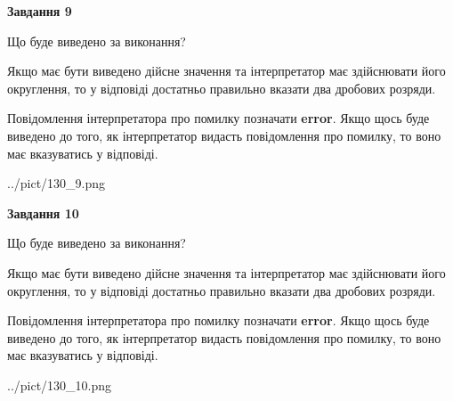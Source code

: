 \documentclass[12pt, ukrainian]{article}
\begin{document}
{\begin {Large}
{\begin {center}\textbf{Завдання 9}\end {center}}\par
Що буде виведено за виконання? \par

Якщо має бути виведено дійсне значення та інтерпретатор має здійснювати його округлення, 
то у відповіді достатньо правильно вказати два дробових розряди.

Повідомлення інтерпретатора про помилку позначати \textbf{error}.
Якщо щось буде виведено до того, як інтерпретатор видасть повідомлення про помилку, 
то воно має вказуватись у відповіді. \par

\begin{center}
	{../pict/130_9.png}
\end{center}
\newpage

{\begin {center}\textbf{Завдання 10}\end {center}}\par
Що буде виведено за виконання? \par

Якщо має бути виведено дійсне значення та інтерпретатор має здійснювати його округлення, 
то у відповіді достатньо правильно вказати два дробових розряди.

Повідомлення інтерпретатора про помилку позначати \textbf{error}.
Якщо щось буде виведено до того, як інтерпретатор видасть повідомлення про помилку, 
то воно має вказуватись у відповіді. \par

\begin{center}
	{../pict/130_10.png}
\end{center}
\newpage

\end {Large}}
\end{document}
